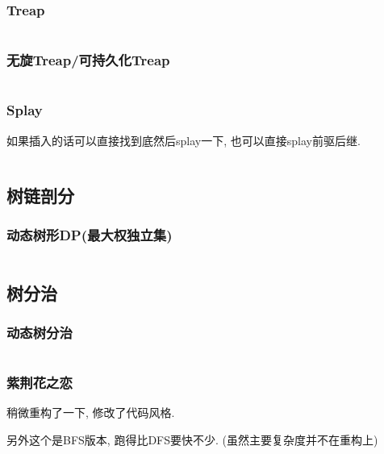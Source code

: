 \documentclass[a4paper, twoside]{article}
\begin{document}
\begin{multicols}{2}
				\subsubsection{Treap}
					\inputminted{cpp}{../src/datastructure/Treap.cpp}
					
				\subsubsection{无旋Treap/可持久化Treap}
					\inputminted{cpp}{../src/datastructure/无旋Treap.cpp}
		
				\subsubsection{Splay}
					如果插入的话可以直接找到底然后splay一下, 也可以直接splay前驱后继.
					\inputminted{cpp}{../src/datastructure/文艺平衡树.cpp}
				
			\subsection{树链剖分}
				\subsubsection{动态树形DP(最大权独立集)}
					\inputminted{cpp}{../src/datastructure/动态树形DP.cpp}
				
			\subsection{树分治}

				
				\subsubsection{动态树分治}
					\inputminted{cpp}{../src/datastructure/动态树分治.cpp}

				\subsubsection{紫荆花之恋}
					稍微重构了一下, 修改了代码风格.

					另外这个是BFS版本, 跑得比DFS要快不少. (虽然主要复杂度并不在重构上)
					\inputminted{cpp}{../src/datastructure/紫荆花之恋.cpp}
	

\end{multicols}
\end{document}
